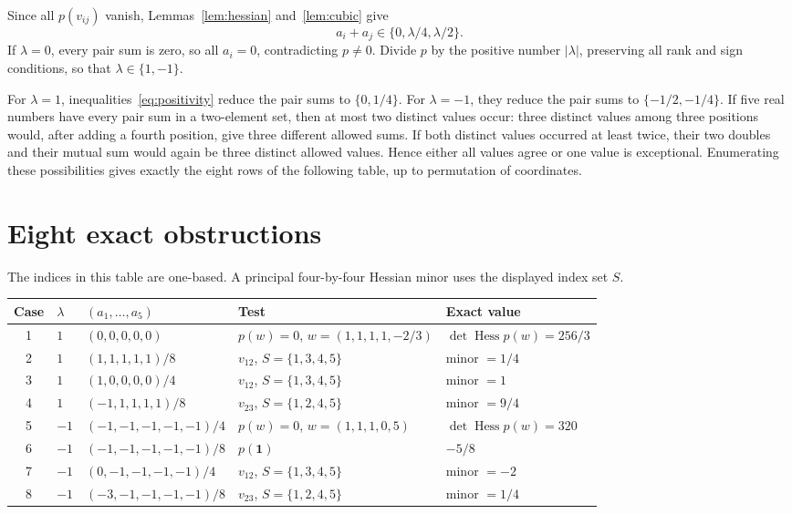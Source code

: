 \documentclass[11pt]{article}
\newcommand{\Hess}{\operatorname{Hess}}
\begin{document}
Since all $p(v_{ij})$ vanish, Lemmas~\ref{lem:hessian} and~\ref{lem:cubic} give
\begin{equation}\label{eq:finite}
 a_i+a_j\in\{0,\lambda/4,\lambda/2\}.
\end{equation}
If $\lambda=0$, every pair sum is zero, so all $a_i=0$, contradicting $p\ne0$. Divide $p$ by the positive number $|\lambda|$, preserving all rank and sign conditions, so that $\lambda\in\{1,-1\}$.

For $\lambda=1$, inequalities~\eqref{eq:positivity} reduce the pair sums to $\{0,1/4\}$. For $\lambda=-1$, they reduce the pair sums to $\{-1/2,-1/4\}$. If five real numbers have every pair sum in a two-element set, then at most two distinct values occur: three distinct values among three positions would, after adding a fourth position, give three different allowed sums. If both distinct values occurred at least twice, their two doubles and their mutual sum would again be three distinct allowed values. Hence either all values agree or one value is exceptional. Enumerating these possibilities gives exactly the eight rows of the following table, up to permutation of coordinates.

\section{Eight exact obstructions}
The indices in this table are one-based. A principal four-by-four Hessian minor uses the displayed index set $S$.
\begin{center}\small
\begin{tabular}{@{}cllll@{}}
\toprule
Case & $\lambda$ & $(a_1,\ldots,a_5)$ & Test & Exact value\\
\midrule
1 & $1$ & $(0,0,0,0,0)$ & $p(w)=0$, $w=(1,1,1,1,-2/3)$ & $\det\Hess p(w)=256/3$\\
2 & $1$ & $(1,1,1,1,1)/8$ & $v_{12}$, $S=\{1,3,4,5\}$ & minor $=1/4$\\
3 & $1$ & $(1,0,0,0,0)/4$ & $v_{12}$, $S=\{1,3,4,5\}$ & minor $=1$\\
4 & $1$ & $(-1,1,1,1,1)/8$ & $v_{23}$, $S=\{1,2,4,5\}$ & minor $=9/4$\\
5 & $-1$ & $(-1,-1,-1,-1,-1)/4$ & $p(w)=0$, $w=(1,1,1,0,5)$ & $\det\Hess p(w)=320$\\
6 & $-1$ & $(-1,-1,-1,-1,-1)/8$ & $p(\mathbf1)$ & $-5/8$\\
7 & $-1$ & $(0,-1,-1,-1,-1)/4$ & $v_{12}$, $S=\{1,3,4,5\}$ & minor $=-2$\\
8 & $-1$ & $(-3,-1,-1,-1,-1)/8$ & $v_{23}$, $S=\{1,2,4,5\}$ & minor $=1/4$\\
\bottomrule
\end{tabular}
\end{center}
\end{document}
